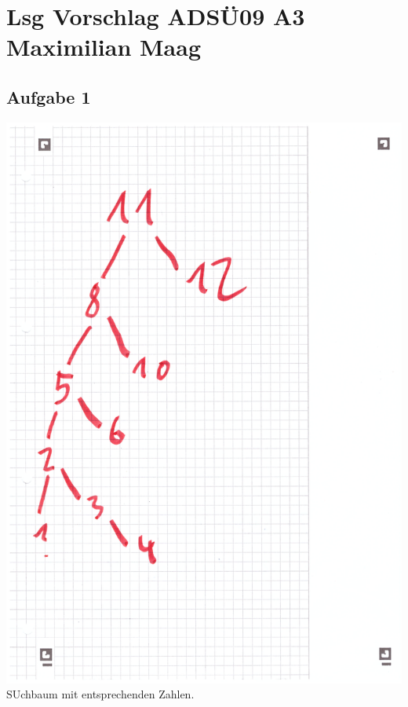 \documentclass{article}
\begin{document}
	\section*{Lsg Vorschlag ADSÜ09 A3 Maximilian Maag}
	\subsection*{Aufgabe 1}
	\includegraphics[width=\linewidth]{090101} \\
	SUchbaum mit entsprechenden Zahlen. \\
\end{document}
